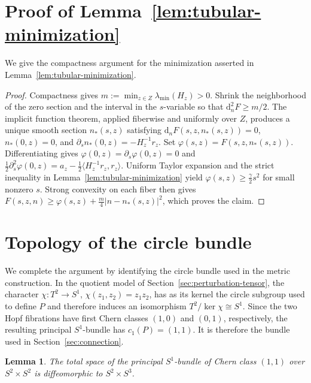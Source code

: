 \documentclass[11pt]{article}
\newtheorem{lemma}[theorem]{Lemma}
\theoremstyle{definition}
\theoremstyle{remark}
\newcommand{\dd}{\mathrm d}
\begin{document}
\section{Proof of Lemma~\ref{lem:tubular-minimization}}                             \label{app:tubular-minimization}

We give the compactness argument for the minimization asserted in
Lemma~\ref{lem:tubular-minimization}.

\begin{proof}
Compactness gives $m:=\min_{z\in Z}\lambda_{\min}(H_z)>0$.
Shrink the neighborhood of the zero section and the interval in the
$s$-variable so that
$\dd_n^2F\geq m/2$.  The implicit function theorem, applied fiberwise and
uniformly over $Z$, produces a unique smooth section $n_*(s,z)$ satisfying
$\dd_n F(s,z,n_*(s,z))=0$, $n_*(0,z)=0$, and
$\partial_s n_*(0,z)=-H_z^{-1}r_z$.  Set
$\varphi(s,z)=F(s,z,n_*(s,z))$.  Differentiating gives
$\varphi(0,z)=\partial_s\varphi(0,z)=0$ and
$\tfrac12\partial_s^2\varphi(0,z)=
a_z-\tfrac12\langle H_z^{-1}r_z,r_z\rangle$.
Uniform Taylor expansion and the strict inequality in
Lemma~\ref{lem:tubular-minimization} yield
$\varphi(s,z)\geq\tfrac\gamma2s^2$ for small nonzero $s$.  Strong convexity
on each fiber then gives
$F(s,z,n)\geq\varphi(s,z)+\tfrac m4|n-n_*(s,z)|^2$,
which proves the claim.
\end{proof}

\section{Topology of the circle bundle}                                            \label{sec:topology}

We complete the argument by identifying the circle bundle used in the metric
construction.  In the quotient model of
Section~\ref{sec:perturbation-tensor}, the character
$\chi:T^2\to S^1$, $\chi(z_1,z_2)=z_1z_2$, has as its kernel the circle
subgroup used to define $P$ and therefore induces an isomorphism
$T^2/\ker\chi\cong S^1$.  Since the two Hopf fibrations have first
Chern classes $(1,0)$ and $(0,1)$, respectively, the resulting principal
$S^1$-bundle has $c_1(P)=(1,1)$.
It is therefore the bundle used in Section~\ref{sec:connection}.

\begin{lemma}                                                                       \label{lem:topology}
The total space of the principal $S^1$-bundle of Chern class $(1,1)$ over
$S^2\times S^2$ is diffeomorphic to $S^2\times S^3$.
\end{lemma}
\end{document}
